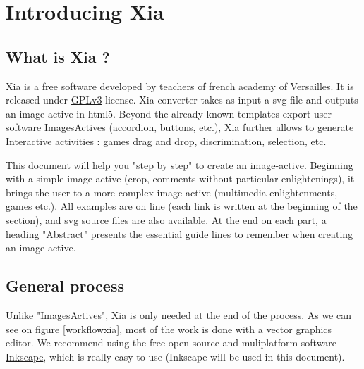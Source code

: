 


 \maketitle
 \tableofcontents
 
 
\section{Introducing Xia}

\subsection{What is Xia ?}

Xia is a free software developed by teachers of french academy of Versailles.
It is released under \href{http://www.gnu.org/copyleft/gpl.html}{GPLv3} license.
Xia converter takes as input a svg file and outputs an image-active in 
html5. Beyond the already known templates export user software ImagesActives 
(\href{http://images-actives.crdp-versailles.fr/spip.php?article11\&lang=fr}
{accordion, buttons, etc.}), Xia further allows to generate
Interactive activities : games drag and drop, discrimination, selection, etc.

This document will help you "step by step" to create an image-active.
Beginning with a simple image-active (crop, comments without particular 
enlightenings), it brings the user to a more complex image-active (multimedia
 enlightenments, games etc.). All examples are on line (each link is written at 
the beginning of the section), and svg source files are also available. At the end
on each part, a heading "Abstract" presents the essential guide lines to 
remember when creating an image-active.

\subsection{General process}

Unlike "ImagesActives", Xia is only needed at the end of the process.
As we can see on figure \ref{workflowxia}, most of the work is done with 
a  vector graphics editor. We recommend using the free open-source and 
muliplatform software \href{http://www.inkscape.org/}{Inkscape}, which is 
really easy to use (Inkscape will be used in this document).

